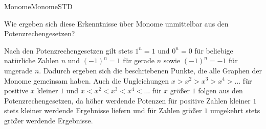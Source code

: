 \begin{MXContent}{Monome}{Monome}{STD}
\begin{MExercise}
Wie ergeben sich diese Erkenntnisse über Monome unmittelbar aus den Potenzrechengesetzen?
\begin{MHint}{\iSolution}
Nach den Potenzrechengesetzen gilt stets $1^n=1$ und $0^n=0$ für beliebige natürliche Zahlen $n$ und $(-1)^n=1$ für gerade $n$ sowie $(-1)^n=-1$ für ungerade $n$. Dadurch ergeben sich die beschriebenen Punkte, die alle Graphen der Monome gemeinsam haben. Auch die Ungleichungen $x>x^2>x^3>x^4>\dots$ für positive $x$ kleiner $1$ und $x<x^2<x^3<x^4<\dots$ für $x$ größer $1$ folgen aus den Potenzrechengesetzen, da höher werdende Potenzen für positive Zahlen kleiner $1$ stets kleiner werdende Ergebnisse liefern und für Zahlen größer $1$ umgekehrt stets größer werdende Ergebnisse.
\end{MHint}
\end{MExercise}

\end{MXContent}

